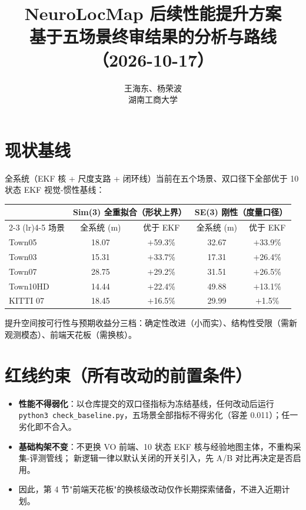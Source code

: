 \documentclass[11pt]{article}
\title{\textbf{NeuroLocMap 后续性能提升方案}\\[4pt]\large 基于五场景终审结果的分析与路线（2026-10-17）}
\author{王海东、杨荣波\\湖南工商大学}
\date{}
\begin{document}
\maketitle

\section{现状基线}

全系统（EKF 核 + 尺度支路 + 闭环线）当前在五个场景、双口径下全部优于 10 状态 EKF 视觉-惯性基线：

\begin{table}[h]
\centering
\small
\begin{tabular}{@{}lcccc@{}}
\toprule
 & \multicolumn{2}{c}{Sim(3) 全重拟合（形状上界）} & \multicolumn{2}{c}{SE(3) 刚性（度量口径）} \\
\cmidrule(lr){2-3} \cmidrule(lr){4-5}
场景 & 全系统 (m) & 优于 EKF & 全系统 (m) & 优于 EKF \\
\midrule
Town05   & 18.07 & $+$59.3\% & 32.67 & $+$33.9\% \\
Town03   & 15.31 & $+$33.7\% & 17.31 & $+$26.4\% \\
Town07   & 28.75 & $+$29.2\% & 31.51 & $+$26.5\% \\
Town10HD & 14.44 & $+$22.4\% & 49.88 & $+$13.1\% \\
KITTI 07 & 18.45 & $+$16.5\% & 29.99 & $+$1.5\%  \\
\bottomrule
\end{tabular}
\end{table}

提升空间按可行性与预期收益分三档：确定性改进（小而实）、结构性受限（需新观测模态）、前端天花板（需换核）。

\section*{红线约束（所有改动的前置条件）}

\begin{itemize}[nosep]
  \item \textbf{性能不得弱化}：以仓库提交的双口径指标为冻结基线，任何改动后运行
  \texttt{python3 check\_baseline.py}，五场景全部指标不得劣化（容差 0.011）；任一劣化即不合入。
  \item \textbf{基础构架不变}：不更换 VO 前端、10 状态 EKF 核与经验地图主体，不重构采集-评测管线；
  新逻辑一律以默认关闭的开关引入，先 A/B 对比再决定是否启用。
  \item 因此，第 4 节"前端天花板"的换核级改动仅作长期探索储备，不进入近期计划。
\end{itemize}
\end{document}
